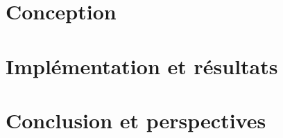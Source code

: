 \documentclass[11pt,twoside]{scrreprt}
\begin{document}
	

\chapter{Conception}
	
	
	
\chapter{Implémentation et résultats}

	
	
\chapter*{Conclusion et perspectives} %
	
	
\end{document}
